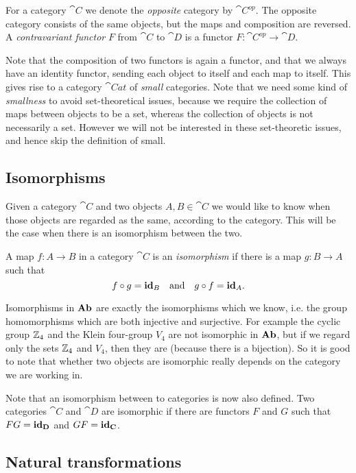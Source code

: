 For a category $\cat{C}$ we denote the \emph{opposite} category by $\cat{C}^{op}$. The opposite category consists of the same objects, but the maps and composition are reversed. A \emph{contravariant functor} $F$ from $\cat{C}$ to $\cat{D}$ is a functor $F: \cat{C}^{op} \to \cat{D}$.

Note that the composition of two functors is again a functor, and that we always have an identity functor, sending each object to itself and each map to itself. This gives rise to a category $\cat{Cat}$ of \emph{small} categories. Note that we need some kind of \emph{smallness} to avoid set-theoretical issues, because we require the collection of maps between objects to be a set, whereas the collection of objects is not necessarily a set. However we will not be interested in these set-theoretic issues, and hence skip the definition of small.

\subsection{Isomorphisms}
Given a category $\cat{C}$ and two objects $A, B \in \cat{C}$ we would like to know when those objects are regarded as the same, according to the category. This will be the case when there is an isomorphism between the two.

\begin{definition}
	A map $f: A \to B$ in a category $\cat{C}$ is an \emph{isomorphism} if there is a map $g: B \to A$ such that
	$$ f \circ g = \mathbf{id}_B \quad\text{and}\quad g \circ f = \mathbf{id}_A.$$
\end{definition}

Isomorphisms in $\mathbf{Ab}$ are exactly the isomorphisms which we know, i.e. the group homomorphisms which are both injective and surjective.
For example the cyclic group $\mathbb{Z}_4$ and the Klein four-group $V_4$ are not isomorphic in $\mathbf{Ab}$, but if we regard only the sets $\mathbb{Z}_4$ and $V_4$, then they are (because there is a bijection). So it is good to note that whether two objects are isomorphic  really depends on the category we are working in.

Note that an isomorphism between to categories is now also defined. Two categories $\cat{C}$ and $\cat{D}$ are isomorphic if there are functors $F$ and $G$ such that $ FG = \mathbf{id}_{\mathbf{D}}$ and $GF = \mathbf{id}_{\mathbf{C}}$.

\subsection{Natural transformations}

